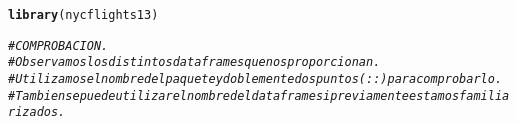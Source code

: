\documentclass{article}\usepackage[]{graphicx}\usepackage[]{xcolor}
\makeatletter
\newcommand{\hlcom}[1]{\textcolor[rgb]{0.678,0.584,0.686}{\textit{#1}}}%
\newcommand{\hlstd}[1]{\textcolor[rgb]{0.345,0.345,0.345}{#1}}%
\newcommand{\hlkwd}[1]{\textcolor[rgb]{0.737,0.353,0.396}{\textbf{#1}}}%
\newenvironment{kframe}{%
 \def\at@end@of@kframe{}%
 \ifinner\ifhmode%
  \def\at@end@of@kframe{\end{minipage}}%
  \begin{minipage}{\columnwidth}%
 \fi\fi%
 \def\FrameCommand##1{\hskip\@totalleftmargin \hskip-\fboxsep
 \colorbox{shadecolor}{##1}\hskip-\fboxsep
     \hskip-\linewidth \hskip-\@totalleftmargin \hskip\columnwidth}%
 \MakeFramed {\advance\hsize-\width
   \@totalleftmargin\z@ \linewidth\hsize
   \@setminipage}}%
 {\par\unskip\endMakeFramed%
 \at@end@of@kframe}
\newenvironment{knitrout}{}{} %
\makeatother
\begin{document}
\begin{knitrout}
\begin{kframe}
{\ttfamily\noindent\itshape\color{messagecolor}{\#\# The following objects are masked from 'package:arules':\\\#\# \\\#\# \ \ \ \ intersect, recode, setdiff, setequal, union}}

{\ttfamily\noindent\itshape\color{messagecolor}{\#\# The following objects are masked from 'package:stats':\\\#\# \\\#\# \ \ \ \ filter, lag}}

{\ttfamily\noindent\itshape\color{messagecolor}{\#\# The following objects are masked from 'package:base':\\\#\# \\\#\# \ \ \ \ intersect, setdiff, setequal, union}}\begin{alltt}
\hlkwd{library}\hlstd{(nycflights13)}

\hlcom{# COMPROBACION.}
\hlcom{# Observamos los distintos dataframes que nos proporcionan.}
\hlcom{# Utilizamos el nombre del paquete y doblemente dos puntos (::) para comprobarlo.}
\hlcom{# Tambien se puede utilizar el nombre del dataframe si previamente estamos familiarizados.}


\end{alltt}
\end{kframe}
\end{knitrout}
\end{document}
